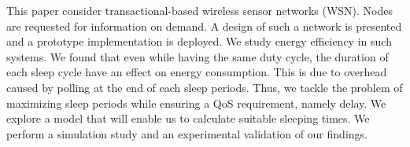 This paper consider transactional-based wireless sensor networks (WSN). Nodes are requested for information on demand. A design of such a network is presented and a prototype implementation is deployed. We study energy efficiency in such systems. We found that even while having the same duty cycle, the duration of each sleep cycle have an effect on energy consumption. This is due to overhead caused by polling at the end of each sleep periods. Thus, we tackle the problem of maximizing sleep periods while ensuring a QoS requirement, namely delay. We explore a model that will enable us to calculate suitable sleeping times. We perform a simulation study and an experimental validation of our findings.

